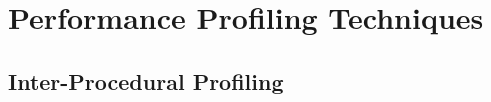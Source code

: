 \chapter{Performance Profiling Techniques}
\label{ch:profiling}


\section{Inter-Procedural Profiling}


